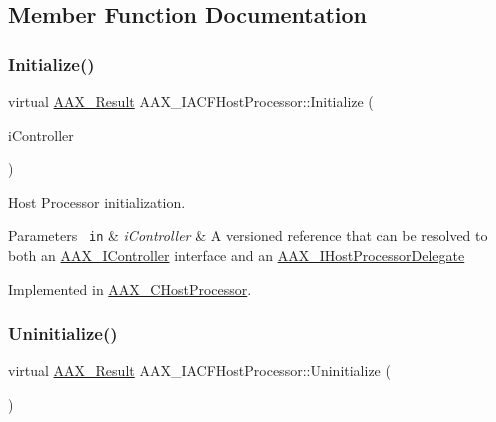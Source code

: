 \subsection{Member Function Documentation}
\mbox{\label{a01693_a00aa7da380e86cd79c6b8da1aa51c3b7}} 
\subsubsection{\texorpdfstring{Initialize()}{Initialize()}}
{\footnotesize\ttfamily virtual \mbox{\hyperlink{a00392_a4d8f69a697df7f70c3a8e9b8ee130d2f}{A\+A\+X\+\_\+\+Result}} A\+A\+X\+\_\+\+I\+A\+C\+F\+Host\+Processor\+::\+Initialize (\begin{DoxyParamCaption}\item[{\mbox{\hyperlink{a01409}{I\+A\+C\+F\+Unknown}} $\ast$}]{i\+Controller }\end{DoxyParamCaption})\hspace{0.3cm}{\ttfamily [pure virtual]}}



Host Processor initialization. 


\begin{DoxyParams}[1]{Parameters}
\mbox{\texttt{ in}}  & {\em i\+Controller} & A versioned reference that can be resolved to both an \mbox{\hyperlink{a01789}{A\+A\+X\+\_\+\+I\+Controller}} interface and an \mbox{\hyperlink{a01837}{A\+A\+X\+\_\+\+I\+Host\+Processor\+Delegate}} \\
\hline
\end{DoxyParams}


Implemented in \mbox{\hyperlink{a01485_afa9d83145a510fb3e37a4831b0f2b3c6}{A\+A\+X\+\_\+\+C\+Host\+Processor}}.

\mbox{\label{a01693_a238fc3fee9180cd52df2c87180f4a656}} 
\subsubsection{\texorpdfstring{Uninitialize()}{Uninitialize()}}
{\footnotesize\ttfamily virtual \mbox{\hyperlink{a00392_a4d8f69a697df7f70c3a8e9b8ee130d2f}{A\+A\+X\+\_\+\+Result}} A\+A\+X\+\_\+\+I\+A\+C\+F\+Host\+Processor\+::\+Uninitialize (\begin{DoxyParamCaption}{ }\end{DoxyParamCaption})\hspace{0.3cm}{\ttfamily [pure virtual]}}



